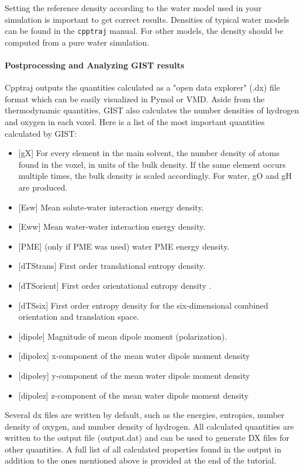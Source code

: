 \documentclass[9pt,tutorial]{livecoms}
\newcommand{\software}{\texttt}
\begin{document}
Setting the reference density according to the water model used in your simulation is important to get correct results.
Densities of typical water models can be found in the \software{cpptraj} manual.
For other models, the density should be computed from a pure water simulation.
 
\paragraph{Postprocessing and Analyzing GIST results}
Cpptraj outputs the quantities calculated as a "open data explorer" (.dx) file format which can be easily visualized in Pymol or VMD.
Aside from the thermodynamic quantities, GIST also calculates the number densities of hydrogen and oxygen in each voxel. Here is a list of the most important quantities calculated by GIST:

\begin{itemize}
	\item{[gX] For every element in the main solvent, the number density of atoms found in the voxel, in units of the bulk density. If the same element occurs multiple times, the bulk density is scaled accordingly. For water, gO and gH are produced.}
	\item{[Esw] Mean solute-water interaction energy density.}
	\item{[Eww] Mean water-water interaction energy density.}
	\item{[PME] (only if PME was used) water PME energy density.}
	\item{[dTStrans] First order translational entropy density.}
	\item{[dTSorient] First order orientational entropy density .}
	\item{[dTSsix] First order entropy density for the six-dimensional combined orientation and translation space.}
	\item{[dipole] Magnitude of mean dipole moment (polarization).}
	\item{[dipolex] x-component of the mean water dipole moment density}
	\item{[dipoley] y-component of the mean water dipole moment density}
	\item{[dipolez] z-component of the mean water dipole moment density}
\end{itemize}

Several dx files are written by default, such as the energies, entropies, number density of oxygen, and number density of hydrogen. All calculated quantities are written to the output file (output.dat) and can be used to generate DX files for other quantities. A full list of all calculated properties found in the output in addition to the ones mentioned above is provided at the end of the tutorial.
\end{document}
